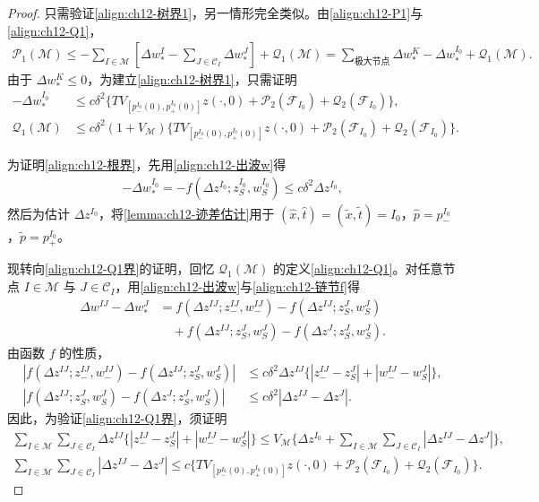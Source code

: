 \documentclass[../../main.tex]{subfiles}
\begin{document}
\begin{proof}
只需验证\eqref{align:ch12-树界1}，另一情形完全类似。由\eqref{align:ch12-P1}与\eqref{align:ch12-Q1}，
\begin{align}
\mathscr{P}_1(\mathscr{M})\leqslant-\sum_{I\in\mathscr{M}}[\Delta w_*^I-\sum_{J\in\mathscr{C}_I}\Delta w_*^J]+\mathscr{Q}_1(\mathscr{M})
=\sum_{\text{极大节点}}\Delta w_*^K-\Delta w_*^{I_0}+\mathscr{Q}_1(\mathscr{M}).
\label{align:ch12-P1 telescoping}
\end{align}
由于 $\Delta w_*^K\leqslant0$，为建立\eqref{align:ch12-树界1}，只需证明
\begin{align}
-\Delta w_*^{I_0}&\leqslant c\delta^2\{TV_{[p_-^{I_0}(0),p_+^{I_0}(0)]}z(\cdot,0)+\mathscr{P}_2(\mathscr{F}_{I_0})+\mathscr{Q}_2(\mathscr{F}_{I_0})\},
\label{align:ch12-根界}\\
\mathscr{Q}_1(\mathscr{M})&\leqslant c\delta^2(1+V_{\mathscr{M}})\{TV_{[p_-^{I_0}(0),p_+^{I_0}(0)]}z(\cdot,0)+\mathscr{P}_2(\mathscr{F}_{I_0})+\mathscr{Q}_2(\mathscr{F}_{I_0})\}.
\label{align:ch12-Q1界}
\end{align}

为证明\eqref{align:ch12-根界}，先用\eqref{align:ch12-出波w}得
\begin{align}
-\Delta w_*^{I_0}=-f(\Delta z^{I_0};z_S^{I_0},w_S^{I_0})\leqslant c\delta^2\Delta z^{I_0},
\label{align:ch12-根界f}
\end{align}
然后为估计 $\Delta z^{I_0}$，将\cref{lemma:ch12-迹差估计}用于 $(\hat x,\hat t)=(\tilde x,\tilde t)=I_0$，$\hat p=p_-^{I_0}$，$\tilde p=p_+^{I_0}$。

现转向\eqref{align:ch12-Q1界}的证明，回忆 $\mathscr{Q}_1(\mathscr{M})$ 的定义\eqref{align:ch12-Q1}。对任意节点 $I\in\mathscr{M}$ 与 $J\in\mathscr{C}_I$，用\eqref{align:ch12-出波w}与\eqref{align:ch12-链节f}得
\begin{align}
\Delta w^{IJ}-\Delta w_*^J&=f(\Delta z^{IJ};z_-^{IJ},w_-^{IJ})-f(\Delta z^{IJ};z_S^J,w_S^J)\nonumber\\
&\quad+f(\Delta z^{IJ};z_S^J,w_S^J)-f(\Delta z^J;z_S^J,w_S^J).
\label{align:ch12-Q1分解}
\end{align}
由函数 $f$ 的性质，
\begin{align}
|f(\Delta z^{IJ};z_-^{IJ},w_-^{IJ})-f(\Delta z^{IJ};z_S^J,w_S^J)|&\leqslant c\delta^2\Delta z^{IJ}\{|z_-^{IJ}-z_S^J|+|w_-^{IJ}-w_S^J|\},
\label{align:ch12-f估计1}\\
|f(\Delta z^{IJ};z_S^J,w_S^J)-f(\Delta z^J;z_S^J,w_S^J)|&\leqslant c\delta^2|\Delta z^{IJ}-\Delta z^J|.
\label{align:ch12-f估计2}
\end{align}
因此，为验证\eqref{align:ch12-Q1界}，须证明
\begin{align}
\sum_{I\in\mathscr{M}}\sum_{J\in\mathscr{C}_I}\Delta z^{IJ}\{|z_-^{IJ}-z_S^J|+|w_-^{IJ}-w_S^J|\}
\leqslant V_{\mathscr{M}}\{\Delta z^{I_0}+\sum_{I\in\mathscr{M}}\sum_{J\in\mathscr{C}_I}|\Delta z^{IJ}-\Delta z^J|\},
\label{align:ch12-Q1归结1}\\
\sum_{I\in\mathscr{M}}\sum_{J\in\mathscr{C}_I}|\Delta z^{IJ}-\Delta z^J|
\leqslant c\{TV_{[p_-^{I_0}(0),p_+^{I_0}(0)]}z(\cdot,0)+\mathscr{P}_2(\mathscr{F}_{I_0})+\mathscr{Q}_2(\mathscr{F}_{I_0})\}.
\label{align:ch12-Q1归结2}
\end{align}


\end{proof}
\end{document}
